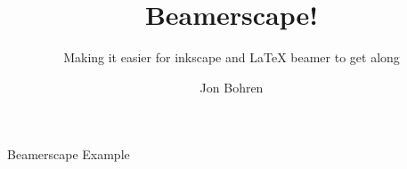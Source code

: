 \documentclass{beamer}
\begin{document}
\title[Beamerscape]{\bf Beamerscape!}
\subtitle{Making it easier for inkscape and \LaTeX{} beamer to get along}
\author[Jon Bohren]{Jon Bohren}
\date{}

\begin{frame}[plain]
  \maketitle
\end{frame}

\begin{frame}{Beamerscape Example}
  
\end{frame}
\end{document}
